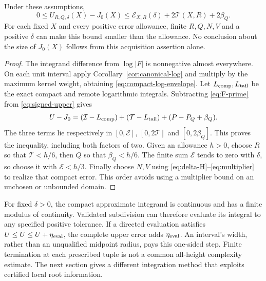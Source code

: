 \begin{theorem}\label{thm:signed-acquisition}
Under these assumptions,
\begin{equation}\label{eq:signed-acquisition-error}
 0\le U_{R,Q,\delta}(X)-J_0(X)
 \le\mathcal E_{X,R}(\delta)+2\mathcal T(X,R)+2\beta_Q.
\end{equation}
For each fixed \(X\) and every positive error allowance, finite
\(R,Q,N,V\) and a positive \(\delta\) can make this bound smaller
than the allowance. No conclusion about the size of \(J_0(X)\) follows
from this acquisition assertion alone.
\end{theorem}
\begin{proof}
The integrand difference from \(\log|F|\) is nonnegative almost
everywhere. On each unit interval apply Corollary~\ref{cor:canonical-log}
and multiply by the maximum kernel weight, obtaining
\eqref{eq:compact-log-envelope}. Let \(L_{\rm comp},L_{\rm tail}\)
be the exact compact and remote logarithmic integrals. Subtracting
\eqref{eq:F-prime} from \eqref{eq:signed-upper} gives
\[
 U-J_0=(\mathcal I-L_{\rm comp})+
        (\mathcal T-L_{\rm tail})+(P-P_Q+\beta_Q).
\]
The three terms lie respectively in
\([0,\mathcal E]\), \([0,2\mathcal T]\) and \([0,2\beta_Q]\).
This proves the inequality, including both factors of two.
Given an allowance \(h>0\), choose \(R\) so that \(\mathcal T<h/6\),
then \(Q\) so that \(\beta_Q<h/6\). The finite sum \(\mathcal E\)
tends to zero with \(\delta\), so choose it with \(\mathcal E<h/3\).
Finally choose \(N,V\) using \eqref{eq:delta-H}--\eqref{eq:multiplier}
to realize that compact error. This order avoids using a multiplier
bound on an unchosen or unbounded domain.
\end{proof}

For fixed \(\delta>0\), the compact approximate integrand is continuous
and has a finite modulus of continuity. Validated subdivision can
therefore evaluate its integral to any specified positive tolerance.
If a directed evaluation satisfies \(U\le\overline U\le U+\eta_{\rm eval}\),
the complete upper error adds \(\eta_{\rm eval}\). An interval's width,
rather than an unqualified midpoint radius, pays this one-sided step.
Finite termination at each prescribed tuple is not a common all-height
complexity estimate. The next section gives a different integration
method that exploits certified local root information.
